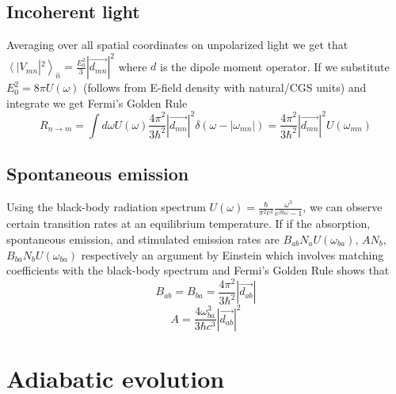 \documentclass{article}
\newcommand{\bra}[1]{\left\langle #1 \right|}
\newcommand{\ket}[1]{\left|#1\right\rangle}
\begin{document}
\subsection{Incoherent light}
Averaging over all spatial coordinates on unpolarized light we get that $\bra{}V_{mn}\ket{^2}_{\hat{n}} = \frac{E_0^2}{3} |\vec{d_{mn}}|^2$ where $d$ is the dipole moment operator. If we substitute $E_0^2 = 8\pi U(\omega)$ (follows from E-field density with natural/CGS units) and integrate we get Fermi's Golden Rule
\begin{equation}
\boxed{
R_{n\rightarrow m} = \int d\omega U(\omega) \frac{4\pi^2}{3\hbar^2} |\vec{d_{mn}}|^2 \delta(\omega-|\omega_{mn}|) =  \frac{4\pi^2}{3\hbar^2} |\vec{d_{mn}}|^2 U(\omega_{mn})
}
\end{equation}
\subsection{Spontaneous emission}
Using the black-body radiation spectrum $U(\omega) = \frac{\hbar}{\pi^2 c^3} \frac{\omega^3}{e^{\beta\hbar\omega}-1}$, we can observe certain transition rates at an equilibrium temperature. If if the absorption, spontaneous emission, and stimulated emission rates are $B_{ab}N_aU(\omega_{ba})$, $AN_b$, $B_{ba} N_b U(\omega_{ba})$ respectively an argument by Einstein which involves matching coefficients with the black-body spectrum and Fermi's Golden Rule shows that
$$B_{ab}=B_{ba} =\frac{4\pi^2}{3\hbar^2} |\vec{d_{ab}}|$$
$$A=\frac{4\omega_{ba}^3}{3\hbar c^3} |\vec{d_{ab}}|^2$$
\section{Adiabatic evolution}
\end{document}
